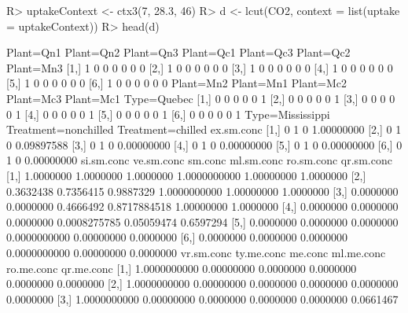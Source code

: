 \begin{Schunk}
% --begin: "pbld2"
\begin{Sinput}
R> uptakeContext <- ctx3(7, 28.3, 46)
R> d <- lcut(CO2, context = list(uptake = uptakeContext))
R> head(d)
\end{Sinput}
\begin{Soutput}
     Plant=Qn1 Plant=Qn2 Plant=Qn3 Plant=Qc1 Plant=Qc3 Plant=Qc2 Plant=Mn3
[1,]         1         0         0         0         0         0         0
[2,]         1         0         0         0         0         0         0
[3,]         1         0         0         0         0         0         0
[4,]         1         0         0         0         0         0         0
[5,]         1         0         0         0         0         0         0
[6,]         1         0         0         0         0         0         0
     Plant=Mn2 Plant=Mn1 Plant=Mc2 Plant=Mc3 Plant=Mc1 Type=Quebec
[1,]         0         0         0         0         0           1
[2,]         0         0         0         0         0           1
[3,]         0         0         0         0         0           1
[4,]         0         0         0         0         0           1
[5,]         0         0         0         0         0           1
[6,]         0         0         0         0         0           1
     Type=Mississippi Treatment=nonchilled Treatment=chilled ex.sm.conc
[1,]                0                    1                 0 1.00000000
[2,]                0                    1                 0 0.09897588
[3,]                0                    1                 0 0.00000000
[4,]                0                    1                 0 0.00000000
[5,]                0                    1                 0 0.00000000
[6,]                0                    1                 0 0.00000000
     si.sm.conc ve.sm.conc   sm.conc   ml.sm.conc ro.sm.conc qr.sm.conc
[1,]  1.0000000  1.0000000 1.0000000 1.0000000000 1.00000000  1.0000000
[2,]  0.3632438  0.7356415 0.9887329 1.0000000000 1.00000000  1.0000000
[3,]  0.0000000  0.0000000 0.4666492 0.8717884518 1.00000000  1.0000000
[4,]  0.0000000  0.0000000 0.0000000 0.0008275785 0.05059474  0.6597294
[5,]  0.0000000  0.0000000 0.0000000 0.0000000000 0.00000000  0.0000000
[6,]  0.0000000  0.0000000 0.0000000 0.0000000000 0.00000000  0.0000000
       vr.sm.conc ty.me.conc   me.conc ml.me.conc ro.me.conc qr.me.conc
[1,] 1.0000000000 0.00000000 0.0000000  0.0000000  0.0000000  0.0000000
[2,] 1.0000000000 0.00000000 0.0000000  0.0000000  0.0000000  0.0000000
[3,] 1.0000000000 0.00000000 0.0000000  0.0000000  0.0000000  0.0661467

\end{Soutput}
\end{Schunk}
